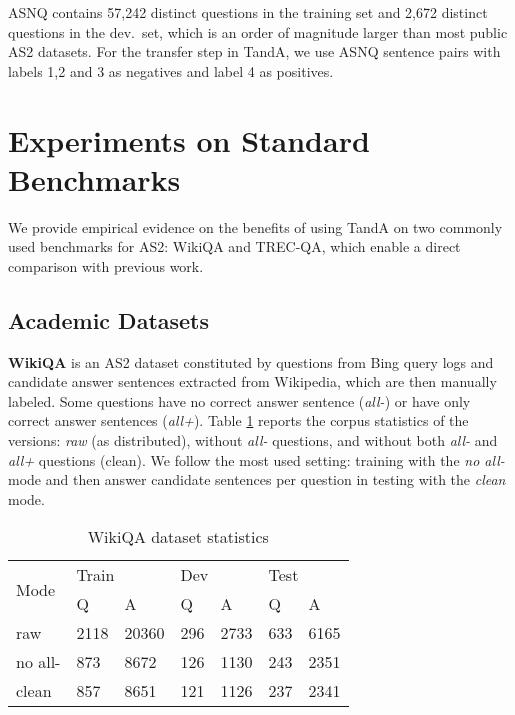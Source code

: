 \documentclass[letterpaper]{article} \usepackage{aaai20}  \usepackage{times}  \usepackage{helvet} \usepackage{courier}  \usepackage[hyphens]{url}  \usepackage{graphicx} \urlstyle{rm} \def\UrlFont{\rm}  \usepackage{graphicx}  \usepackage{todonotes}
\newcommand{\TANDA}{T{\sc and}A}
\begin{document}
ASNQ contains 57,242 distinct questions in the training set and 2,672 distinct questions in the dev.~set, which is an order of magnitude larger than most public AS2 datasets. For the transfer step in {\TANDA},  we use ASNQ sentence pairs with labels 1,2 and 3 as negatives and label 4 as positives.






\section{Experiments on Standard Benchmarks}
\label{bench}
We provide empirical evidence on the benefits of using {\TANDA} on two commonly used benchmarks for AS2: \mbox{WikiQA} and TREC-QA, which enable a direct comparison with previous work.

\subsection{Academic Datasets}
\textbf{WikiQA} is an AS2 dataset \cite{yang-etal-2015-wikiqa} constituted by questions from Bing query logs and candidate answer sentences extracted from Wikipedia, which are then manually labeled. Some questions have no correct answer sentence (\textit{all-}) or have only correct answer sentences \mbox{(\textit{all+})}. Table \ref{Table:WikiQA_description}  reports the corpus statistics of the versions: \emph{raw} (as distributed), without \emph{all-} questions, and without both \textit{all-} and \textit{all+} questions (clean). We follow the most used setting: training with the \emph{no all-} mode and then answer candidate sentences per question in testing with the \emph{clean} mode.

\begin{table}[t]
\small
\center
\begin{tabular}{|l|l|l|l|l|l|l|}
\hline
\multirow{2}{*}{Mode} & \multicolumn{2}{l|}{Train} & \multicolumn{2}{l|}{Dev} & \multicolumn{2}{l|}{Test} \\ \cline{2-7} 
                      & Q           & A            & Q          & A           & Q           & A           \\ \hline
raw                   & 2118    & 20360        & 296        & 2733        & 633         & 6165        \\ \hline
no all-              & 873         & 8672         & 126        & 1130        & 243         & 2351        \\ \hline
clean                 & 857         & 8651         & 121        & 1126        & 237         & 2341        \\ \hline
\end{tabular}
\caption{WikiQA dataset statistics}
\label{Table:WikiQA_description}
\end{table}
\end{document}
